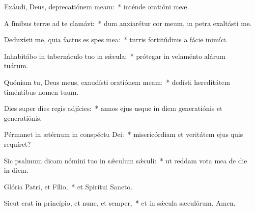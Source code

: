 \item Exáudi, Deus, deprecatiónem meam:~* inténde oratióni meæ.

\item A fínibus terræ ad te clamávi:~* dum anxiarétur cor meum, in petra exaltásti me.

\item Deduxísti me, quia factus es spes mea:~* turris fortitúdinis a fácie inimíci.

\item Inhabitábo in tabernáculo tuo in sǽcula:~* prótegar in velaménto alárum tuárum.

\item Quóniam tu, Deus meus, exaudísti oratiónem meam:~* dedísti hereditátem timéntibus nomen tuum.

\item Dies super dies regis adjícies:~* annos ejus usque in diem generatiónis et generatiónis.

\item Pérmanet in ætérnum in conspéctu Dei:~* misericórdiam et veritátem ejus quis requíret?

\item Sic psalmum dicam nómini tuo in sǽculum sǽculi:~* ut reddam vota mea de die in diem.

\item Glória Patri, et Fílio,~* et Spirítui Sancto.

\item Sicut erat in princípio, et nunc, et semper,~* et in sǽcula sæculórum. Amen.

